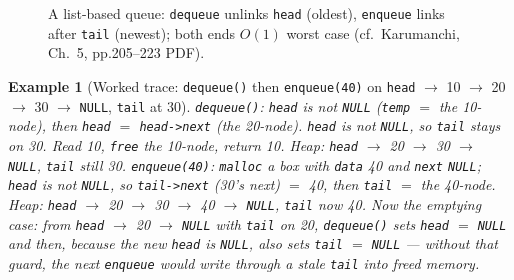 \documentclass[11pt]{article}
\newtheorem{example}{Example}[section]
\begin{document}
\begin{figure}[h]
  \centering
  \caption{A list-based queue: \texttt{dequeue} unlinks \texttt{head} (oldest), \texttt{enqueue} links after \texttt{tail} (newest); both ends $O(1)$ worst case (cf.\ Karumanchi, Ch.~5, pp.205--223 PDF).}
  \label{fig:list-queue}
\end{figure}

\begin{example}[Worked trace: \texttt{dequeue()} then \texttt{enqueue(40)} on \texttt{head} $\to$ 10 $\to$ 20 $\to$ 30 $\to$ \texttt{NULL}, \texttt{tail} at 30]
\texttt{dequeue()}: \texttt{head} is not \texttt{NULL} (\texttt{temp} $=$ the 10-node), then \texttt{head} $=$ \texttt{head->next} (the 20-node). \texttt{head} is not \texttt{NULL}, so \texttt{tail} stays on 30. Read 10, \texttt{free} the 10-node, return 10. Heap: \texttt{head} $\to$ 20 $\to$ 30 $\to$ \texttt{NULL}, \texttt{tail} still 30. \texttt{enqueue(40)}: \texttt{malloc} a box with \texttt{data} 40 and \texttt{next} \texttt{NULL}; \texttt{head} is not \texttt{NULL}, so \texttt{tail->next} (30's next) $=$ 40, then \texttt{tail} $=$ the 40-node. Heap: \texttt{head} $\to$ 20 $\to$ 30 $\to$ 40 $\to$ \texttt{NULL}, \texttt{tail} now 40. Now the emptying case: from \texttt{head} $\to$ 20 $\to$ \texttt{NULL} with \texttt{tail} on 20, \texttt{dequeue()} sets \texttt{head} $=$ \texttt{NULL} and then, because the new \texttt{head} is \texttt{NULL}, also sets \texttt{tail} $=$ \texttt{NULL} --- without that guard, the next \texttt{enqueue} would write through a stale \texttt{tail} into freed memory.
\end{example}
\end{document}
